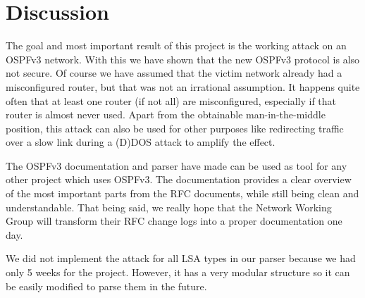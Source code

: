 \documentclass[11pt,a4paper,oneside]{article}
\newcommand{\lsection}[2]{\section{#1}\label{sec:#2}}
\begin{document}
    \lsection{Discussion}{discussion}
    The goal and most important result of this project is the working attack on an OSPFv3 network.
    With this we have shown that the new OSPFv3 protocol is also not secure.
    Of course we have assumed that the victim network already had a misconfigured router, but that was not an irrational assumption.
    It happens quite often that at least one router (if not all) are misconfigured, especially if that router is almost never used.
    Apart from the obtainable man-in-the-middle position, this attack can also be used for other purposes like redirecting traffic over a slow link during a (D)DOS attack to amplify the effect.

    The OSPFv3 documentation and parser have made can be used as tool for any other project which uses OSPFv3.
    The documentation provides a clear overview of the most important parts from the RFC documents, while still being clean and understandable.
    That being said, we really hope that the Network Working Group will transform their RFC change logs into a proper documentation one day.

    We did not implement the attack for all LSA types in our parser because we had only 5 weeks for the project.
    However, it has a very modular structure so it can be easily modified to parse them in the future.
\end{document}
